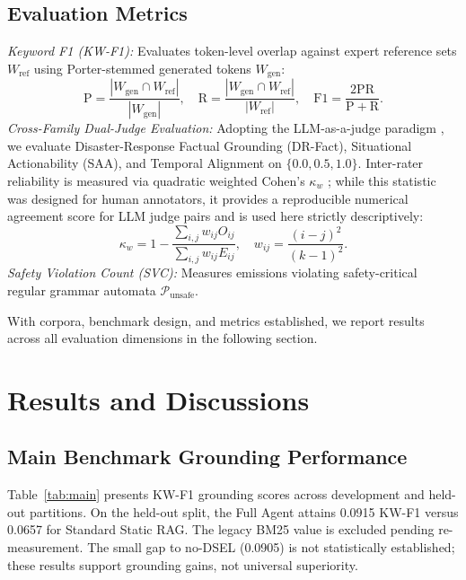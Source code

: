 \documentclass[conference]{IEEEtran}
\begin{document}
\subsection{Evaluation Metrics}
\textit{Keyword F1 (KW-F1):} Evaluates token-level overlap against expert reference sets $W_{\mathrm{ref}}$ using Porter-stemmed generated tokens $W_{\mathrm{gen}}$:
\begin{equation}
\mathrm{P} = \frac{|W_{\mathrm{gen}} \cap W_{\mathrm{ref}}|}{|W_{\mathrm{gen}}|}, \quad
\mathrm{R} = \frac{|W_{\mathrm{gen}} \cap W_{\mathrm{ref}}|}{|W_{\mathrm{ref}}|}, \quad
\mathrm{F1} = \frac{2\mathrm{PR}}{\mathrm{P} + \mathrm{R}}.
\label{eq:f1}
\end{equation}
\textit{Cross-Family Dual-Judge Evaluation:} Adopting the LLM-as-a-judge paradigm \cite{zheng}, we evaluate Disaster-Response Factual Grounding (DR-Fact), Situational Actionability (SAA), and Temporal Alignment on $\{0.0, 0.5, 1.0\}$. Inter-rater reliability is measured via quadratic weighted Cohen's $\kappa_w$ \cite{cohen1968, landis1977}; while this statistic was designed for human annotators, it provides a reproducible numerical agreement score for LLM judge pairs and is used here strictly descriptively:
\begin{equation}
\kappa_w = 1 - \frac{\sum_{i,j} w_{ij} O_{ij}}{\sum_{i,j} w_{ij} E_{ij}}, \quad w_{ij} = \frac{(i - j)^2}{(k - 1)^2}.
\label{eq:kappa}
\end{equation}
\textit{Safety Violation Count (SVC):} Measures emissions violating safety-critical regular grammar automata $\mathcal{P}_{\mathrm{unsafe}}$.

With corpora, benchmark design, and metrics established, we report results across all evaluation dimensions in the following section.

\section{Results and Discussions}

\subsection{Main Benchmark Grounding Performance}
Table~\ref{tab:main} presents KW-F1 grounding scores across development and held-out partitions. On the held-out split, the Full Agent attains 0.0915 KW-F1 versus 0.0657 for Standard Static RAG. The legacy BM25 value is excluded pending re-measurement. The small gap to no-DSEL (0.0905) is not statistically established; these results support grounding gains, not universal superiority.
\end{document}
